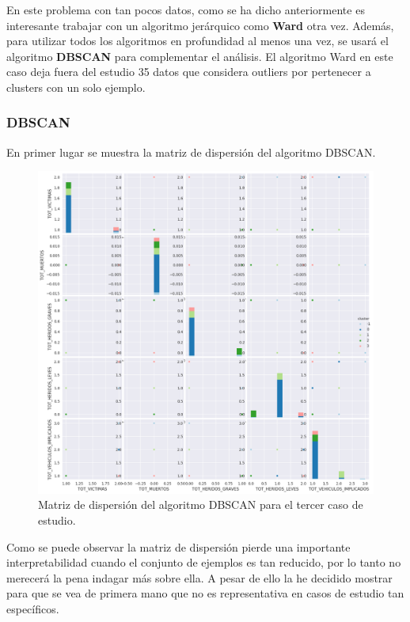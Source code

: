 	En este problema con tan pocos datos, como se ha dicho anteriormente es interesante trabajar con un algoritmo jerárquico como \textbf{Ward} otra vez. Además, para utilizar todos los algoritmos en profundidad al menos una vez, se usará el algoritmo \textbf{DBSCAN} para complementar el análisis. El algoritmo Ward en este caso deja fuera del estudio 35 datos que considera outliers por pertenecer a clusters con un solo ejemplo.
	
	\subsubsection{DBSCAN}
	
	En primer lugar se muestra la matriz de dispersión del algoritmo DBSCAN.
	
	\begin{figure}[H]
		\centering
		\includegraphics[scale=0.5]{plots/DBSCAN-WetOverturnedAccidents-ScatterMatrix.png}
		\caption{Matriz de dispersión del algoritmo DBSCAN para el tercer caso de estudio.}
	\end{figure}

	Como se puede observar la matriz de dispersión pierde una importante interpretabilidad cuando el conjunto de ejemplos es tan reducido, por lo tanto no merecerá la pena indagar más sobre ella. A pesar de ello la he decidido mostrar para que se vea de primera mano que no es representativa en casos de estudio tan específicos.\\
	
